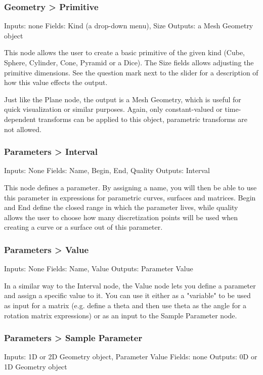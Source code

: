 \subsubsection{Geometry > Primitive}
Inputs: none
Fields: Kind (a drop-down menu), Size
Outputs: a Mesh Geometry object

This node allows the user to create a basic primitive of the given kind
(Cube, Sphere, Cylinder, Cone, Pyramid or a Dice). The Size fields allows
adjusting the primitive dimensions. See the question mark next to the 
slider for a description of how this value effects the output.

Just like the Plane node, the output is a Mesh Geometry, which is useful
for quick visualization or similar purposes. Again, only constant-valued
or time-dependent transforms can be applied to this object,
parametric transforms are not allowed.

\subsubsection{Parameters > Interval}
Inputs: None
Fields: Name, Begin, End, Quality
Outputs: Interval

This node defines a parameter. By assigning a name, you will then be able
to use this parameter in expressions for parametric curves, surfaces and matrices.
Begin and End define the closed range in which the parameter lives, while quality
allows the user to choose how many discretization points will be used when creating
a curve or a surface out of this parameter.

\subsubsection{Parameters > Value}
Inputs: None
Fields: Name, Value
Outputs: Parameter Value

In a similar way to the Interval node, the Value node lets you define a parameter
and assign a specific value to it. You can use it either as a "variable"
to be used as input for a matrix (e.g. define a theta and then use theta as the
angle for a rotation matrix expressions) or as an input to the Sample Parameter node.



\subsubsection{Parameters > Sample Parameter}
Inputs: 1D or 2D Geometry object, Parameter Value
Fields: none
Outputs: 0D or 1D Geometry object

